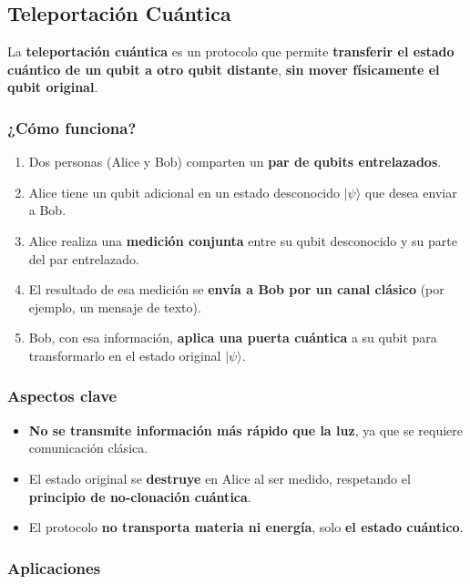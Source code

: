 \documentclass{article}
\begin{document}
\subsection*{Teleportación Cuántica}

La \textbf{teleportación cuántica} es un protocolo que permite \textbf{transferir el estado cuántico de un qubit a otro qubit distante}, \textbf{sin mover físicamente el qubit original}.

\subsubsection*{¿Cómo funciona?}

\begin{enumerate}
    \item Dos personas (Alice y Bob) comparten un \textbf{par de qubits entrelazados}.
    \item Alice tiene un qubit adicional en un estado desconocido $\vert \psi \rangle$ que desea enviar a Bob.
    \item Alice realiza una \textbf{medición conjunta} entre su qubit desconocido y su parte del par entrelazado.
    \item El resultado de esa medición se \textbf{envía a Bob por un canal clásico} (por ejemplo, un mensaje de texto).
    \item Bob, con esa información, \textbf{aplica una puerta cuántica} a su qubit para transformarlo en el estado original $\vert \psi \rangle$.
\end{enumerate}

\subsubsection*{Aspectos clave}

\begin{itemize}
    \item \textbf{No se transmite información más rápido que la luz}, ya que se requiere comunicación clásica.
    \item El estado original se \textbf{destruye} en Alice al ser medido, respetando el \textbf{principio de no-clonación cuántica}.
    \item El protocolo \textbf{no transporta materia ni energía}, solo \textbf{el estado cuántico}.
\end{itemize}

\subsubsection*{Aplicaciones}
\end{document}
